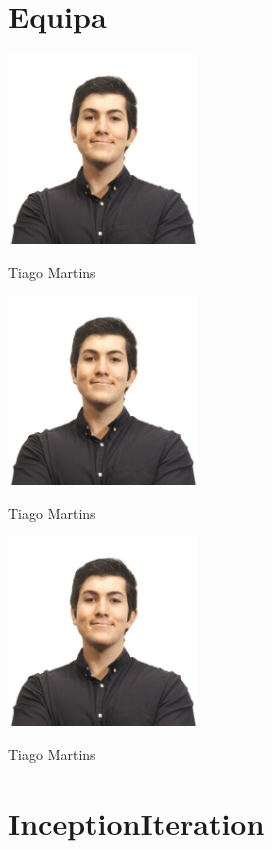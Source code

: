 \documentclass[12pt]{article}
\begin{document}
\section{Equipa}
\centering
\includegraphics[width=5cm]{./assets/index.jpg}

Tiago Martins

\includegraphics[width=5cm]{./assets/index.jpg}

Tiago Martins

\includegraphics[width=5cm]{./assets/index.jpg}

Tiago Martins

\pagebreak

\tableofcontents
\pagebreak


\section{InceptionIteration}





\newpage


\end{document}
